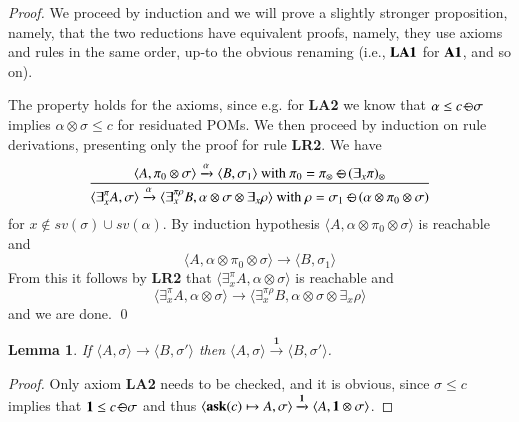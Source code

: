 \documentclass[preprint,12pt]{elsarticle}
\newtheorem{lemma}{Lemma}
\newtheorem{proof}{Proof}
\newcommand{\ask}{{\bf ask}}
\def\monid{{\mathbf 0}}
\def\odiv{\, {\ominus\hspace{-7.7pt} \div} \,}
\def\monid{\mathbf{1}}
\begin{document}
{\begin{proof}
	We proceed by induction and we will prove a slightly stronger proposition, namely, that the two reductions
	have equivalent proofs, namely, they use axioms and rules in the same order,
	up-to the obvious renaming (i.e., ${\bf LA1}$ for ${\bf A1}$, and so on).
	
	The property holds for the axioms, since e.g. for {\bf LA2} we know that
	$\alpha \leq c \odiv \sigma$ implies $\alpha \otimes \sigma \leq c$ for residuated POMs.
	We then proceed by induction on rule derivations,
	presenting only the proof for rule {\bf LR2}.
	We have 
	$$\frac {\displaystyle \langle A, \pi_0 \otimes \sigma \rangle \xrightarrow{\alpha}
		\langle B, \sigma_1 \rangle \text{ with } \pi_0 = \pi_\otimes \; {\ominus\hspace{-7.5pt} \div} \; (\exists_x \pi)_\otimes }
	{\displaystyle \langle \exists^\pi_x A, \sigma \rangle \xrightarrow{\alpha}
		\langle \exists^{\pi \rho}_x B, \alpha \otimes \sigma \otimes \exists_x \rho \rangle  \text{ with } \rho = \sigma_1 \; {\ominus\hspace{-7.5pt} \div} \; (\alpha \otimes \pi_0 \otimes \sigma)}$$
	for $x \not \in sv(\sigma) \cup sv(\alpha)$.
	By induction hypothesis $\langle A, \alpha \otimes \pi_0 \otimes \sigma \rangle$ is reachable and
	$$\langle A, \alpha \otimes \pi_0 \otimes \sigma \rangle \to
	\langle B, \sigma_1 \rangle$$
	From this it follows by {\bf LR2} that $\langle \exists^\pi_x A, \alpha \otimes \sigma \rangle$ is reachable and
	$$\langle \exists^\pi_x A, \alpha \otimes \sigma \rangle \to
	\langle \exists^{\pi \rho}_x B, \alpha \otimes \sigma \otimes \exists_x \rho \rangle$$
	and we are done.
	\qed
\end{proof}

\setcounter{lemma}{11}
\begin{lemma}
	\label{idred}
	If %
	$\langle A, \sigma \rangle \to \langle B, \sigma' \rangle$
	then %
	$\langle A, \sigma \rangle \xrightarrow{\monid}  \langle B, \sigma' \rangle$.
\end{lemma}
\begin{proof}
	Only axiom  {\bf LA2} needs to be checked, and it is obvious, since $\sigma \leq c$ implies that 
	$\monid \leq c \odiv \sigma$ and thus 
	$\langle \hbox{\ask}(c) \mapsto A, \sigma \rangle \xrightarrow{\monid}
	\langle A, \monid \otimes \sigma \rangle$.
\end{proof}	

}
\end{document}
